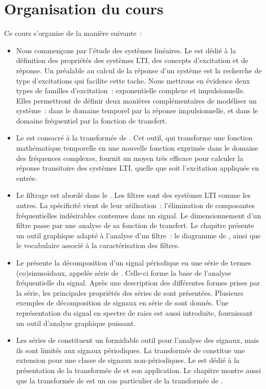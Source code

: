 	\section{Organisation du cours}
	Ce cours s'organise de la manière suivante~:
	\begin{itemize}
		\item Nous commençons par l'étude des systèmes linéaires. Le  est dédié à la définition des propriétés des systèmes LTI, des concepts d'excitation et de réponse. Un préalable au calcul de la réponse d'un système est la recherche de type d'excitations qui facilite cette tache. Nous mettrons en évidence deux types de familles d'excitation~: exponentielle complexe et impulsionnelle. Elles permettront de définir deux manières complémentaires de modéliser un système~: dans le domaine temporel par la réponse impulsionnelle, et dans le domaine fréquentiel par la fonction de transfert.
		\item Le  est consacré à la transformée de \Laplace{}. Cet outil, qui transforme une fonction mathématique temporelle en une nouvelle fonction exprimée dans le domaine des fréquences complexes, fournit un moyen très efficace pour calculer la réponse transitoire des systèmes LTI, quelle que soit l'excitation appliquée en entrée.
		\item Le filtrage est abordé dans le . Les filtres sont des systèmes LTI comme les autres. La spécificité vient de leur utilisation~: l'élimination de composantes fréquentielles indésirables contenues dans un signal. Le dimensionnement d'un filtre passe par une analyse de sa fonction de transfert. Le chapitre présente un outil graphique adapté à l'analyse d'un filtre~: le diagramme de \Bode{}, ainsi que le vocabulaire associé à la caractérisation des filtres.
		\item Le  présente la décomposition d'un signal périodique en une série de termes (co)sinusoïdaux, appelée série de \Fourier{}. Celle-ci forme la base de l'analyse fréquentielle du signal. Après une description des différentes formes prises par la série, les principales propriétés des séries de \Fourier{} sont présentées. Plusieurs exemples de décomposition de signaux en série de \Fourier{} sont donnés. Une représentation du signal en spectre de raies est aussi introduite, fournissant un outil d'analyse graphique puissant.
		\item Les séries de \Fourier{} constituent un formidable outil pour l'analyse des signaux, mais ils sont limités aux signaux périodiques. La transformée de \Fourier{} constitue une extension pour une classe de signaux non-périodiques. Le  est dédié à la présentation de la transformée de \Fourier{} et son application. Le chapitre montre aussi que la transformée de \Fourier{} est un cas particulier de la transformée de \Laplace{}.

\end{itemize}
